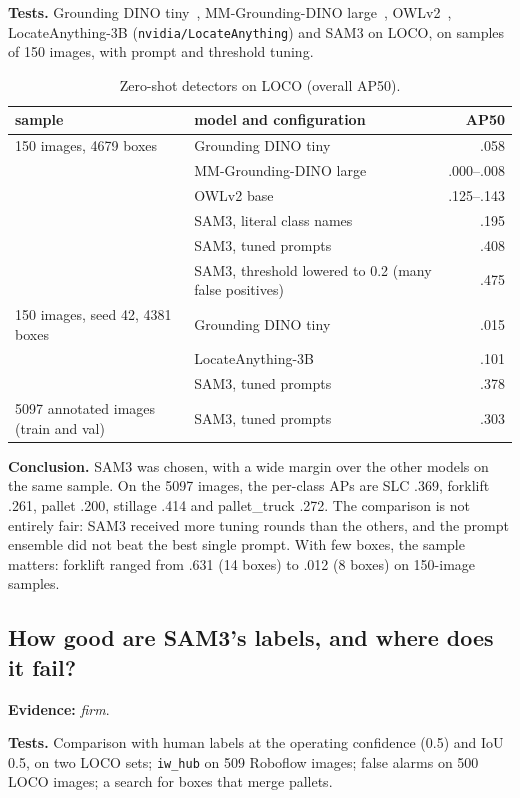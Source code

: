 \documentclass[11pt,a4paper]{article}
\newcommand{\evidence}[1]{\noindent\textbf{Evidence:} \emph{#1}.\par}
\newcommand{\tests}{\noindent\textbf{Tests.} }
\newcommand{\conclusion}{\noindent\textbf{Conclusion.} }
\begin{document}
\tests Grounding DINO tiny~\cite{gdino}, MM-Grounding-DINO large~\cite{mmgdino},
OWLv2~\cite{owlv2}, LocateAnything-3B (\texttt{nvidia/LocateAnything}) and SAM3 on
LOCO, on samples of 150 images, with prompt and threshold tuning.

\begin{table}[H]
\centering\small
\caption{Zero-shot detectors on LOCO (overall AP50).}
\begin{tabular}{llr}
\toprule
sample & model and configuration & AP50 \\
\midrule
150 images, 4679 boxes & Grounding DINO tiny & .058 \\
& MM-Grounding-DINO large & .000--.008 \\
& OWLv2 base & .125--.143 \\
& SAM3, literal class names & .195 \\
& SAM3, tuned prompts & .408 \\
& SAM3, threshold lowered to 0.2 (many false positives) & .475 \\
\midrule
150 images, seed 42, 4381 boxes & Grounding DINO tiny & .015 \\
& LocateAnything-3B & .101 \\
& SAM3, tuned prompts & .378 \\
\midrule
5097 annotated images (train and val) & SAM3, tuned prompts & .303 \\
\bottomrule
\end{tabular}
\end{table}

\conclusion SAM3 was chosen, with a wide margin over the other models on the same
sample. On the 5097 images, the per-class APs are SLC .369, forklift .261, pallet
.200, stillage .414 and pallet\_truck .272. The comparison is not entirely fair:
SAM3 received more tuning rounds than the others, and the prompt ensemble did not
beat the best single prompt. With few boxes, the sample matters: forklift ranged
from .631 (14 boxes) to .012 (8 boxes) on 150-image samples.

\subsection{How good are SAM3's labels, and where does it fail?}
\evidence{firm}

\tests Comparison with human labels at the operating confidence (0.5) and IoU 0.5,
on two LOCO sets; \texttt{iw\_hub} on 509 Roboflow images; false alarms on 500 LOCO
images; a search for boxes that merge pallets.
\end{document}
